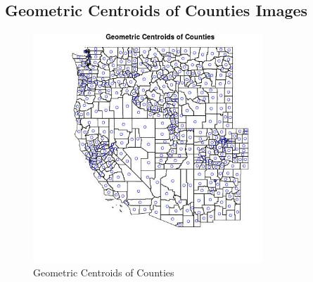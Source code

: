 
\subsection{Geometric Centroids of Counties Images} 
 

\begin{figure} 
\centering  
\includegraphics[width=0.77\textwidth]{Code_Outputs/CountyGeometricCentroids_MapLocations.jpg} 
\caption{\label{fig:CountyGeometricCentroidsMapLocations}Geometric Centroids of Counties} 
\end{figure} 
 
